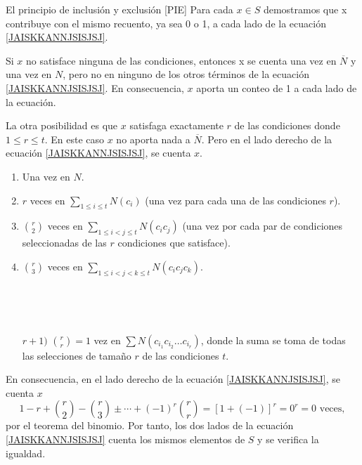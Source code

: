 \begin{theorem}{El principio de inclusión y exclusión [PIE]}{}
    \hspace*{6mm}Para cada $x \in S$ demostramos que x contribuye con el mismo recuento, ya sea 0 o 1, a cada lado de la ecuación \eqref{JAISKKANNJSISJSJ}.
    
    \hspace*{6mm}Si $x$ no satisface ninguna de las condiciones, entonces x se cuenta una vez en $\overline{N}$ y una vez en $N$, pero no en ninguno de los otros términos de la ecuación \eqref{JAISKKANNJSISJSJ}. En consecuencia, $x$ aporta un conteo de 1 a cada lado de la ecuación.
    
    \hspace*{6mm}La otra posibilidad es que $x$ satisfaga exactamente $r$ de las condiciones donde $1 \leq r \leq t$. En este caso $x$ no aporta nada a $\overline{N}$. Pero en el lado derecho de la ecuación \eqref{JAISKKANNJSISJSJ}, se cuenta $x$.
    \begin{enumerate}[label=\arabic*)]
        \item Una vez en $N$.
        \item $r$ veces en $\displaystyle \sum_{1 \leq i \leq t} N(c_i)$ (una vez para cada una de las condiciones $r$).
        \item $\displaystyle \binom{r}{2}$ veces en $\displaystyle \sum_{1 \leq i < j \leq t} N(c_i c_j)$ (una vez por cada par de condiciones seleccionadas de las $r$ condiciones que satisface).
        \item $\displaystyle \binom{r}{3}$ veces en $\displaystyle \sum_{1 \leq i < j < k \leq t} N(c_i c_j c_k)$.

        \,\\
        \,\\
        
        \item[$r + 1)$] $\displaystyle \binom{r}{r} = 1$ vez en $\displaystyle \sum N(c_{i_1} c_{i_2} \dots c_{i_r})$, donde la suma se toma de todas las selecciones de tamaño $r$ de las condiciones $t$.
    \end{enumerate}
    En consecuencia, en el lado derecho de la ecuación \eqref{JAISKKANNJSISJSJ}, se cuenta $x$
    $$1 - r + \binom{r}{2} - \binom{r}{3} \pm \cdots + (-1)^r \binom{r}{r} = [1 + (-1)]^r = 0^r = 0 \text{ veces},$$
    por el teorema del binomio. Por tanto, los dos lados de la ecuación \eqref{JAISKKANNJSISJSJ} cuenta los mismos elementos de $S$ y se verifica la igualdad.
\end{theorem}

